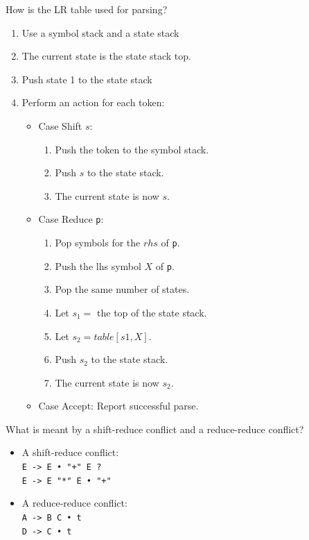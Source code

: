 \documentclass[11pt]{beamer}
\begin{document}
\begin{frame}


\begin{block}{How is the LR table used for parsing?}
\begin{enumerate}

\item Use a symbol stack and a state stack
\item The current state is the state stack top. 
\item Push state 1 to the state stack
\item Perform an action for each token:
\begin{itemize}
\item Case Shift $s$:
\begin{enumerate}
\item Push the token to the symbol stack.
\item Push $s$ to the state stack.
\item The current state is now $s$.
\end{enumerate}
\item Case Reduce \texttt{p}:
\begin{enumerate}
\item Pop symbols for the $rhs$ of \texttt{p}.
\item Push the lhs symbol $X$ of \texttt{p}.
\item Pop the same number of states.
\item Let $s_1 =$ the top of the state stack.
\item Let $s_2 = table[s1,X]$.
\item Push $s_2$ to the state stack.
\item The current state is now $s_2$.
\end{enumerate}
\item Case Accept: Report successful parse.
\end{itemize}

\end{enumerate}
\end{block}


\end{frame}

\begin{frame}
\begin{block}{What is meant by a shift-reduce conflict and a reduce-reduce conflict?}
\begin{itemize}
\item A shift-reduce conflict:\\
\texttt{E -> E • "+" E    ?}\\
\texttt{E -> E   "*" E • "+"}
\item A reduce-reduce conflict:\\
\texttt{A -> B C • t}\\
\texttt{D -> C •   t}
\end{itemize}
\end{block}



\end{frame}
\end{document}
